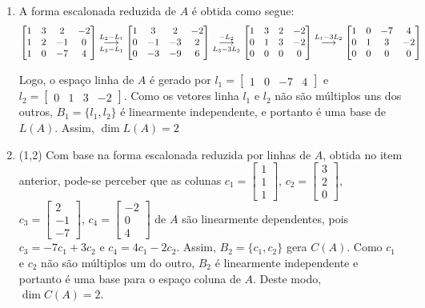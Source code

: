 \documentclass[12pt,a4paper]{article}
\newcommand{\grstep}[2][\relax]{%
   \ensuremath{\mathrel{
       {\mathop{\longrightarrow}\limits^{#2\mathstrut}_{
                                     \begin{subarray}{l} #1 \end{subarray}}}}}}
\begin{document}
\begin{ExerciseList}
\Answer
\begin{enumerate}
\item A forma escalonada reduzida de $A$ é obtida como segue:
\[
\begin{bmatrix}
1 & 3 &  2 & -2 \\
1 & 2 & -1 &  0\\
1 & 0 & -7 &  4
\end{bmatrix}
\grstep[L_3-L_1]{ L_2 - L_1 }
\begin{bmatrix}
1 & 3 &  2 & -2 \\
0 & -1 & -3 & 2\\
0 & -3 & -9 & 6
\end{bmatrix}
\grstep[L_3-3L_2]{ -L_2 }
\begin{bmatrix}
1 & 3 &  2 & -2 \\
0 & 1 & 3 & -2\\
0 & 0 & 0 & 0
\end{bmatrix}
\grstep{ L_1-3L_2 }
\begin{bmatrix}
1 & 0 & -7 &  4 \\
0 & 1 &  3 & -2\\
0 & 0 &  0 &  0
\end{bmatrix}
\]

Logo, o espaço linha de $A$ é gerado por $l_1 = \begin{bmatrix}
1 & 0 & -7 & 4
\end{bmatrix}$ e $l_2 = \begin{bmatrix}
0 & 1 & 3 & -2
\end{bmatrix}$. Como os vetores linha $l_1$ e $l_2$ não são múltiplos uns dos outros, $B_1=\{ l_1, l_2 \}$ é linearmente independente, e portanto é uma base de $L(A)$. Assim, $\dim{L(A)} = 2$

\item (1,2) Com base na forma escalonada reduzida por linhas de $A$, obtida no item anterior, pode-se perceber que as colunas
$c_1 = \begin{bmatrix}
1\\1\\1
\end{bmatrix}$,
$c_2 = \begin{bmatrix}
3\\2\\0
\end{bmatrix}$,
$c_3 = \begin{bmatrix}
2\\-1\\-7
\end{bmatrix}$,
$c_4 = \begin{bmatrix}
-2\\0\\4
\end{bmatrix}$ de $A$ são linearmente dependentes, pois $c_3 = -7c_1 + 3c_2$ e $c_4 = 4c_1 -2c_2$. Assim, $B_2 = \{ c_1, c_2 \}$ gera $C(A)$. Como $c_1$ e $c_2$ não são múltiplos um do outro, $B_2$ é linearmente independente e portanto é uma base para o espaço coluna de $A$. Deste modo, $\dim{C(A)} = 2$.
\end{enumerate}


\end{ExerciseList}
\end{document}
